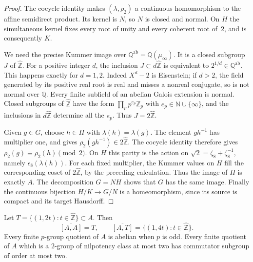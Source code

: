 \begin{proof}
The cocycle identity makes $(\lambda,\rho _2)$ a continuous homomorphism to
the affine semidirect product. Its kernel is $N$, so $N$ is closed and normal.
On $H$ the simultaneous kernel fixes every root of unity and every coherent
root of~$2$, and is consequently $K$.

We need the precise Kummer image over $\mathbb Q^{\mathrm{ab}}
=\mathbb Q(\mu _\infty)$. It is a closed subgroup $J$ of
$\widehat{\mathbb Z}$. For a positive integer $d$, the inclusion
$J\subset d\widehat{\mathbb Z}$ is equivalent to
$2^{1/d}\in\mathbb Q^{\mathrm{ab}}$. This happens exactly for $d=1,2$.
Indeed $X^d-2$ is Eisenstein; if $d>2$, the field generated by its positive
real root is real and misses a nonreal conjugate, so is not normal over
$\mathbb Q$. Every finite subfield of an abelian Galois extension is normal.
Closed subgroups of $\widehat{\mathbb Z}$ have the form
$\prod_p p^{e_p}\mathbb Z_p$ with $e_p\in\mathbb N\cup\{\infty\}$,
and the inclusions in $d\widehat{\mathbb Z}$ determine all the $e_p$.
Thus $J=2\widehat{\mathbb Z}$.

Given $g\in G$, choose $h\in H$ with $\lambda(h)=\lambda(g)$.
The element $gh^{-1}$ has multiplier one, and
\cite[Lemma~7(c)]{H17} gives $\rho _2(gh^{-1})\in2\widehat{\mathbb Z}$.
The cocycle identity therefore gives
$\rho _2(g)\equiv\rho _2(h)\pmod2$. On $H$ this parity is the action
on $\sqrt2=\zeta _8+\zeta _8^{-1}$, namely $\epsilon _8(\lambda(h))$.
For each fixed multiplier, the Kummer values on $H$ fill the corresponding
coset of $2\widehat{\mathbb Z}$, by the preceding calculation. Thus the
image of $H$ is exactly $A$. The decomposition $G=NH$ shows that $G$ has
the same image. Finally the continuous bijection $H/K\to G/N$ is a
homeomorphism, since its source is compact and its target Hausdorff.
\end{proof}

\begin{proposition}\label{prop:arithmetic-commutators}
Let $T=\{(1,2t):t\in\widehat{\mathbb Z}\}\subset A$.
Then
\[
 \overline{[A,A]}=T,\qquad
 \overline{[A,T]}=\{(1,4t):t\in\widehat{\mathbb Z}\}.
\]
Every finite $p$-group quotient of $A$ is abelian when $p$ is odd.
Every finite quotient of $A$ which is a $2$-group of nilpotency class at
most two has commutator subgroup of order at most two.
\end{proposition}

